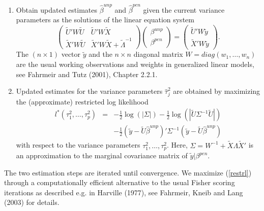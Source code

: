 \begin{enumerate}
\item Obtain updated estimates $\hat{\beta}^{unp}$ and $\hat{\beta}^{pen}$ given the current variance parameters
as the solutions of the linear equation system
\begin{equation}
\label{equsystem} \left(
\begin{array}{ll}
\tilde{U}' W  \tilde{U} & \tilde{U}' W  \tilde{X} \\
\tilde{X}' W  \tilde{U} & \tilde{X}' W  \tilde{X} +
\tilde{\Lambda}^{-1}
\end{array}
\right) \left(
\begin{array}{l}
\beta^{unp} \\
\beta^{pen}
\end{array}
\right) = \left(
\begin{array}{l}
\tilde{U}'W \tilde{y} \\
\tilde{X}'W \tilde{y}
\end{array}
\right).
\end{equation}
The $(n \times 1)$ vector $\tilde{y}$ and the $n \times n$
diagonal matrix $W = diag(w_1,\dots,w_n)$ are the usual working
observations and weights in generalized linear models, see
Fahrmeir and Tutz (2001), Chapter 2.2.1.
\item Updated estimates for the variance parameters $\hat{\tau}_j^2$ are obtained by maximizing
the (approximate) restricted log likelihood
\begin{equation}
\label{restrl}
\begin{array}{lll}
l^{\ast}(\tau^2_1,\dots,\tau^2_p) & = & -\frac{1}{2}
\log(|\Sigma|) - \frac{1}{2} \log(|\tilde{U} \Sigma^{-1}
\tilde{U}|) \\ [0.3cm] & & - \frac{1}{2} (\tilde{y} - \tilde{U}
\hat{\beta}^{unp})' \Sigma^{-1} (\tilde{y} - \tilde{U}
\hat{\beta}^{unp})
\end{array}
\end{equation}
with respect to the variance parameters $\tau^2_1,\dots,\tau^2_p$.
Here, $\Sigma = W^{-1} + \tilde{X} \Lambda \tilde{X}'$ is an
approximation to the marginal covariance matrix of $\tilde{y} |
\beta^{pen}$.
\end{enumerate}

The two estimation steps are iterated until convergence. We
maximize (\ref{restrl}) through a computationally efficient
alternative to the usual Fisher scoring iterations as described
e.g. in Harville (1977), see Fahrmeir, Kneib and Lang (2003) for
details.


